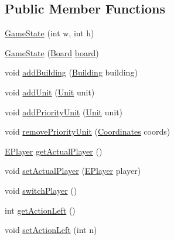 \subsection*{Public Member Functions}
\begin{DoxyCompactItemize}
\item 
\mbox{\hyperlink{classgame_1_1game_state_1_1_game_state_a2af3edd7bad5467700803bcad2e17c43}{Game\+State}} (int w, int h)
\item 
\mbox{\hyperlink{classgame_1_1game_state_1_1_game_state_ae248b3c15e5355261423c9f6a443bcd3}{Game\+State}} (\mbox{\hyperlink{classgame_1_1board_1_1_board}{Board}} \mbox{\hyperlink{classgame_1_1game_state_1_1_game_state_ad22688d7dca32fbc677dce94b9cf3862}{board}})
\item 
void \mbox{\hyperlink{classgame_1_1game_state_1_1_game_state_a1062a7a5164975ed330180b3ba47c7b2}{add\+Building}} (\mbox{\hyperlink{classgame_1_1board_1_1_building}{Building}} building)
\item 
void \mbox{\hyperlink{classgame_1_1game_state_1_1_game_state_a1e0ecf6737cb33799a09b30eb5f81431}{add\+Unit}} (\mbox{\hyperlink{classgame_1_1board_1_1_unit}{Unit}} unit)
\item 
void \mbox{\hyperlink{classgame_1_1game_state_1_1_game_state_a3fbe9f547d5175914f4785a40d1871ad}{add\+Priority\+Unit}} (\mbox{\hyperlink{classgame_1_1board_1_1_unit}{Unit}} unit)
\item 
void \mbox{\hyperlink{classgame_1_1game_state_1_1_game_state_a97278bc7001044fe8be64c4a9e890867}{remove\+Priority\+Unit}} (\mbox{\hyperlink{classrule_engine_1_1_coordinates}{Coordinates}} coords)
\item 
\mbox{\hyperlink{enumgame_1_1_e_player}{E\+Player}} \mbox{\hyperlink{classgame_1_1game_state_1_1_game_state_a418ba65b15c926ef486b0a04090910d0}{get\+Actual\+Player}} ()
\item 
void \mbox{\hyperlink{classgame_1_1game_state_1_1_game_state_a92394b3a782113ba3e2a19397099dcd4}{set\+Actual\+Player}} (\mbox{\hyperlink{enumgame_1_1_e_player}{E\+Player}} player)
\item 
void \mbox{\hyperlink{classgame_1_1game_state_1_1_game_state_a8c72ae2f7753681316a4a1d16e183b6e}{switch\+Player}} ()
\item 
int \mbox{\hyperlink{classgame_1_1game_state_1_1_game_state_ab098a3f062ba9ad6eddc030911d85506}{get\+Action\+Left}} ()
\item 
void \mbox{\hyperlink{classgame_1_1game_state_1_1_game_state_afdbab1b9e1116bfa025e589355bcc0fe}{set\+Action\+Left}} (int n)
\item 

\end{DoxyCompactItemize}
